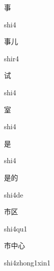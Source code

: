 \begin{multicols*}{2}
\begin{verbete}[shi4]{事}
\begin{pronuncia}{shi4}
\end{pronuncia}
\end{verbete}

\begin{verbete}[shir4]{事儿}
\begin{pronuncia}{shir4}
\end{pronuncia}
\end{verbete}

\begin{verbete}[shi4]{试}
\begin{pronuncia}{shi4}
\end{pronuncia}
\end{verbete}

\begin{verbete}[shi4]{室}
\begin{pronuncia}{shi4}
\end{pronuncia}
\end{verbete}

\begin{verbete}[shi4]{是}
\begin{pronuncia}{shi4}
\end{pronuncia}
\end{verbete}

\begin{verbete}[shi4de]{是的}
\begin{pronuncia}{shi4de}
\end{pronuncia}
\end{verbete}

\begin{verbete}[shi4qu1]{市区}
\begin{pronuncia}{shi4qu1}
\end{pronuncia}
\end{verbete}

\begin{verbete}{市中心}
\begin{pronuncia}{shi4zhong1xin1}
\end{pronuncia}
\end{verbete}


\end{multicols*}
